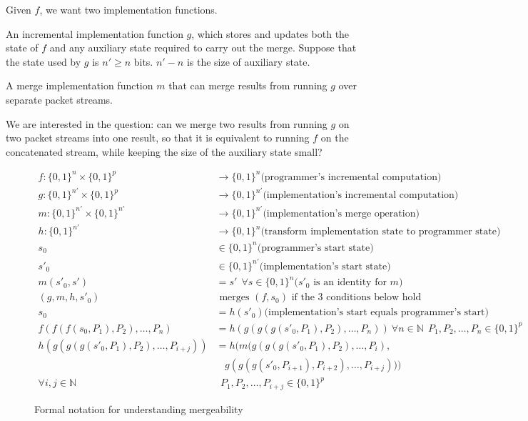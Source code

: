 Given $f$, we want two implementation functions.
\begin{CompactEnumerate}
\item An incremental implementation function $g$, which stores and updates both
the state of $f$ and any auxiliary state required to carry out the merge.
Suppose that the state used by $g$ is $n' \geq n$ bits. $n'-n$ is the
size of auxiliary state.
\item A merge implementation function $m$ that can merge results from running
$g$ over separate packet streams.
\end{CompactEnumerate}

We are interested in the question: can we merge two results from running $g$ on
two packet streams into one result, so that it is equivalent to running $f$ on
the concatenated stream, while keeping the size of the auxiliary state small?

\begin{figure}[!t]
\begin{align}
f : \{0, 1\}^n \times \{0, 1\}^p & \rightarrow \{0, 1\}^n \mbox{(programmer's incremental computation)} \nonumber \\
g : \{0, 1\}^{n'} \times \{0, 1\}^p  & \rightarrow \{0, 1\}^{n'} \mbox{(implementation's incremental computation)} \nonumber \\
m : \{0, 1\}^{n'} \times \{0, 1\}^{n'} & \rightarrow \{0, 1\}^{n'} \mbox{(implementation's merge operation)} \nonumber \\
h : \{0, 1\}^{n'}               & \rightarrow \{0, 1\}^n  \mbox{(transform
 implementation state to programmer state)} \nonumber \\
s_0  & \in \{0, 1\}^n \mbox{(programmer's start state)} \nonumber \\
s'_0 & \in \{0, 1\}^{n'} \mbox{(implementation's start state)} \nonumber \\
m(s'_0, s') & = s' \ \ \forall s \in \{0, 1\}^{n} \mbox{($s'_0$ is an identity for $m$)} \nonumber \\
(g, m, h, s'_0) & \mbox { merges } (f, s_0) \mbox{ if the 3 conditions below hold } \nonumber \\
s_0 & = h(s'_0) \mbox{(implementation's start equals programmer's start)} \label{eqn:start_condition} \\
f(f(f(s_0, P_1), P_2), \dots, P_n) & = h(g(g(g(s'_0, P_1), P_2), \dots, P_n)) \ \forall n \in \mathbb{N} \ \ P_1, P_2, \dots, P_n \in \{0, 1\}^p \label{eqn:projection_condition} \\
h(g(g(g(s'_0, P_1), P_2), \dots, P_{i+j})) & =h( m(g(g(g(s'_0, P_1), P_2), \dots, P_{i}), \nonumber \\
&\ \ \ \ g(g(g(s'_0, P_{i+1}), P_{i+2}), \dots, P_{i+j}))) \nonumber \\
\forall i, j \in \mathbb{N} & \ \  P_1, P_2, \dots, P_{i+j} \in \{0, 1\}^p \label{eqn:merge_condition}
\end{align}
\caption{Formal notation for understanding mergeability}
\label{fig:formal}
\end{figure}

